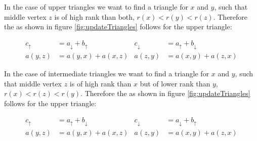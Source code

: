 In the case of upper triangles we want to find a triangle for $x$ and $y$, such that middle vertex $z$ is of high rank than both,  $r(x) < r(y) < r(z)$.
Therefore the as shown in figure \ref{fig:updateTriangles} follows for the upper triangle:

\begin{align*}\label{eq:upper_triangle}
    c_\uparrow & = a_\downarrow + b_\uparrow    &  c_\downarrow & = a_\uparrow + b_\downarrow \\
    a(y, z) & = a(y, x) + a(x, z) & a(z, y) & = a(x, y) + a(z, x)
\end{align*}

In the case of intermediate triangles we want to find a triangle for $x$ and $y$, such that middle vertex $z$ is of high rank than $x$ but of lower rank than $y$,  $r(x) < r(z) < r(y)$.
Therefore the as shown in figure \ref{fig:updateTriangles} follows for the upper triangle:

\begin{align*}
    c_\uparrow & = a_\uparrow + b_\downarrow    &  c_\downarrow & = a_\downarrow + b_\uparrow \\
    a(y, z) & = a(y, x) + a(x, z) & a(z, y) & = a(x, y) + a(z, x)
\end{align*}
